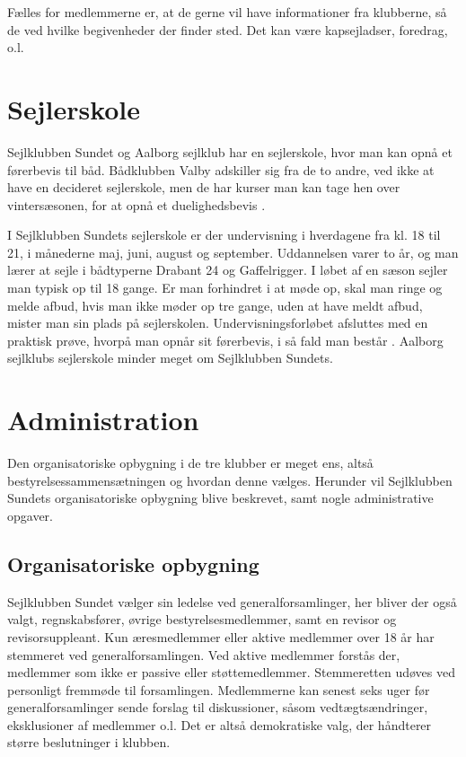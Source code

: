 Fælles for medlemmerne er, at de gerne vil have informationer fra klubberne, så de ved hvilke begivenheder der
finder sted. Det kan være kapsejladser, foredrag, o.l.


\section{Sejlerskole}\label{sec:sejlerskole}

Sejlklubben Sundet og Aalborg sejlklub har en sejlerskole, hvor man kan opnå et førerbevis til båd. Bådklubben
Valby adskiller sig fra de to andre, ved ikke at have en decideret sejlerskole, men de har kurser man kan
tage hen over vintersæsonen, for at opnå et duelighedsbevis \citep{baedklubben_valby_duelighedsbevis}.

I Sejlklubben Sundets sejlerskole er der undervisning i hverdagene fra kl. 18 til 21, i månederne
maj, juni, august og september. Uddannelsen varer to år, og man lærer at sejle i bådtyperne Drabant 24 og
Gaffelrigger. I løbet af en sæson sejler man typisk op til 18 gange. Er man forhindret i at møde op, skal man
ringe og melde afbud, hvis man ikke møder op tre gange, uden at have meldt afbud, mister man sin plads på
sejlerskolen. Undervisningsforløbet afsluttes med en praktisk prøve, hvorpå man opnår sit førerbevis, i så
fald man består \citep{Sundet}. Aalborg sejlklubs sejlerskole minder meget om Sejlklubben Sundets.


\section{Administration}\label{sec:organisatoriske-opbygning}

Den organisatoriske opbygning i de tre klubber er meget ens, altså bestyrelsessammensætningen og hvordan denne
vælges. Herunder vil Sejlklubben Sundets organisatoriske opbygning blive beskrevet, samt nogle administrative
opgaver.


\subsection{Organisatoriske opbygning}\label{subsec:organisatoriske-opbygning}

Sejlklubben Sundet vælger sin ledelse ved generalforsamlinger, her bliver der også valgt, regnskabsfører,
øvrige bestyrelsesmedlemmer, samt en revisor og revisorsuppleant. Kun æresmedlemmer eller aktive medlemmer
over 18 år har stemmeret ved generalforsamlingen. Ved aktive medlemmer forstås der, medlemmer som ikke er
passive eller støttemedlemmer. Stemmeretten udøves ved personligt fremmøde til forsamlingen. Medlemmerne kan
senest seks uger før generalforsamlinger sende forslag til diskussioner, såsom vedtægtsændringer, eksklusioner
af medlemmer o.l. Det er altså demokratiske valg, der håndterer større beslutninger i klubben.


